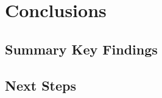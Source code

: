 \section[Conclusions]{Conclusions}
\label{sec:conclusions}

\subsection[Summary Key Findings]{Summary Key Findings}
\label{sec:key-findings}


\subsection[Next Steps]{Next Steps}
\label{sec:next-steps}


